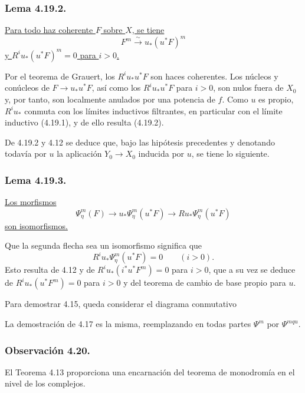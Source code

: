 \subsubsection*{Lema 4.19.2.}
\underline{Para todo haz coherente $F$ sobre $X$, se tiene}
\[
F^m\xrightarrow{\ \sim\ }u_*(u^*F)^m
\]
\underline{y $R^iu_*(u^*F)^m=0$ para $i>0$.}

\pageoriginale

Por el teorema de Grauert, los $R^iu_*u^*F$ son haces coherentes. Los
núcleos y conúcleos de $F\longrightarrow u_*u^*F$, así como los
$R^iu_*u^*F$ para $i>0$, son nulos fuera de $X_0$ y, por tanto, son
localmente anulados por una potencia de $f$. Como $u$ es propio,
$R^iu_*$ conmuta con los límites inductivos filtrantes, en particular
con el límite inductivo (4.19.1), y de ello resulta (4.19.2).

De 4.19.2 y 4.12 se deduce que, bajo las hipótesis precedentes y
denotando todavía por $u$ la aplicación $Y_0\to X_0$ inducida por $u$,
se tiene lo siguiente.

\subsubsection*{Lema 4.19.3.}
\underline{Los morfismos}
\[
\Psi_\eta^m(F)\longrightarrow
u_*\Psi_\eta^m(u^*F)\longrightarrow
Ru_*\Psi_\eta^m(u^*F)
\]
\underline{son isomorfismos.}

Que la segunda flecha sea un isomorfismo significa que
\[
R^iu_*\Psi_\eta^m(u^*F)=0\qquad(i>0).
\]
Esto resulta de 4.12 y de $R^iu_*(i^*u^*F^m)=0$ para $i>0$, que a su
vez se deduce de $R^iu_*(u^*F^m)=0$ para $i>0$ y del teorema de cambio
de base propio para $u$.

Para demostrar 4.15, queda considerar el diagrama conmutativo
\begin{center}
\end{center}
La demostración de 4.17 es la misma, reemplazando en todas partes
$\Psi^m$ por $\Psi^{mqu}$.

\subsubsection*{Observación 4.20.}
El Teorema 4.13 proporciona una encarnación del teorema de monodromía
en el nivel de los complejos.

